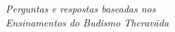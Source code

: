 \cleartorecto
\thispagestyle{empty}
\vspace*{4em}

{\centering
\ifoverleaf\relax%
\else%
  \color[gray]{1}%
\fi

\settowidth{\titleLength}{%
  {\vidalokaFont\fontsize{20}{20}\selectfont\thetitle}%
}

{\vidalokaFont\fontsize{20}{20}\selectfont\thetitle}\\[0.3\baselineskip]
\raisebox{0.5\xheight}{\rule{\titleLength}{0.25pt}}\\[0.3\baselineskip]
{\itshape
Perguntas e respostas baseadas nos\\ Ensinamentos do Budismo Theravāda
}

\vspace*{2em}

\theauthor

}

